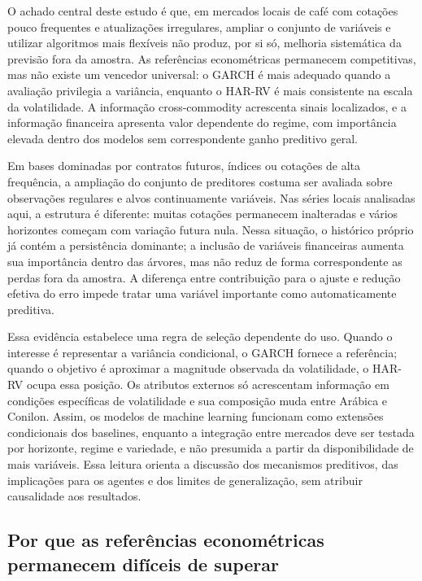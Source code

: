 \documentclass[a4paper,fleqn]{cas-sc}
\begin{document}
O achado central deste estudo é que, em mercados locais de café com cotações pouco frequentes e atualizações irregulares, ampliar o conjunto de variáveis e utilizar algoritmos mais flexíveis não produz, por si só, melhoria sistemática da previsão fora da amostra. As referências econométricas permanecem competitivas, mas não existe um vencedor universal: o GARCH é mais adequado quando a avaliação privilegia a variância, enquanto o HAR-RV é mais consistente na escala da volatilidade. A informação cross-commodity acrescenta sinais localizados, e a informação financeira apresenta valor dependente do regime, com importância elevada dentro dos modelos sem correspondente ganho preditivo geral.

Em bases dominadas por contratos futuros, índices ou cotações de alta frequência, a ampliação do conjunto de preditores costuma ser avaliada sobre observações regulares e alvos continuamente variáveis. Nas séries locais analisadas aqui, a estrutura é diferente: muitas cotações permanecem inalteradas e vários horizontes começam com variação futura nula. Nessa situação, o histórico próprio já contém a persistência dominante; a inclusão de variáveis financeiras aumenta sua importância dentro das árvores, mas não reduz de forma correspondente as perdas fora da amostra. A diferença entre contribuição para o ajuste e redução efetiva do erro impede tratar uma variável importante como automaticamente preditiva.

Essa evidência estabelece uma regra de seleção dependente do uso. Quando o interesse é representar a variância condicional, o GARCH fornece a referência; quando o objetivo é aproximar a magnitude observada da volatilidade, o HAR-RV ocupa essa posição. Os atributos externos só acrescentam informação em condições específicas de volatilidade e sua composição muda entre Arábica e Conilon. Assim, os modelos de machine learning funcionam como extensões condicionais dos baselines, enquanto a integração entre mercados deve ser testada por horizonte, regime e variedade, e não presumida a partir da disponibilidade de mais variáveis. Essa leitura orienta a discussão dos mecanismos preditivos, das implicações para os agentes e dos limites de generalização, sem atribuir causalidade aos resultados.

\subsection{Por que as referências econométricas permanecem difíceis de superar}
\label{subsec:disc_benchmarks}
\end{document}
